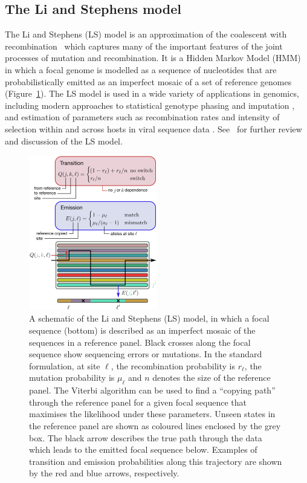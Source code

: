 \documentclass{article}
\begin{document}
\subsection{The Li and Stephens model}
\label{sec:ls}
The Li and Stephens (LS) model \citep{Li2003-ib} is an approximation of the
coalescent with recombination~\citep{Hudson1983-properties} which captures
many of the important features of the joint processes of mutation and
recombination. It is a Hidden Markov Model (HMM) in which a focal genome
is modelled as a
sequence of nucleotides that are probabilistically emitted as
an imperfect mosaic of a set of reference genomes
(Figure~\ref{fig:ls_diagram}).
The LS model is used in a wide variety
of applications in genomics, including modern approaches to
statistical genotype phasing and imputation
\citep{Delaneau2019-wl,Browning2021-cg,Browning2018-nk,Rubinacci2020-pa},
and estimation of parameters such as
recombination rates \citep[e.g.,][]{Hinch2011-tz}
and intensity of selection within and across hosts in viral
sequence data \citep[e.g.,][]{Palmer2019-wa}.
See~\cite{Mcvean2019-linkage} for further review and discussion
of the LS model.

\begin{figure} \centering
\includegraphics[width=0.5\textwidth]{figures/Li_S.pdf}
\caption{\label{fig:ls_diagram} A schematic of the Li and Stephens (LS)
model, in which a focal sequence (bottom) is described as an
imperfect mosaic of the sequences in a reference panel.
Black crosses along the focal sequence show sequencing
errors or mutations.
In the standard formulation, at site $\ell$, the recombination probability is $r_\ell$,
the mutation probability is $\mu_\ell$ and $n$
denotes the size of the reference panel.
The Viterbi algorithm can be used to find a
``copying path'' through the reference panel for a given focal sequence that
maximises the likelihood under these parameters. Unseen states in the reference panel are shown as coloured lines enclosed by
the grey box. The black arrow describes the true path through the data which leads to the emitted
focal sequence below. Examples of transition and
emission probabilities along this trajectory are shown by the red and blue
arrows, respectively.
}
\end{figure}
\end{document}
